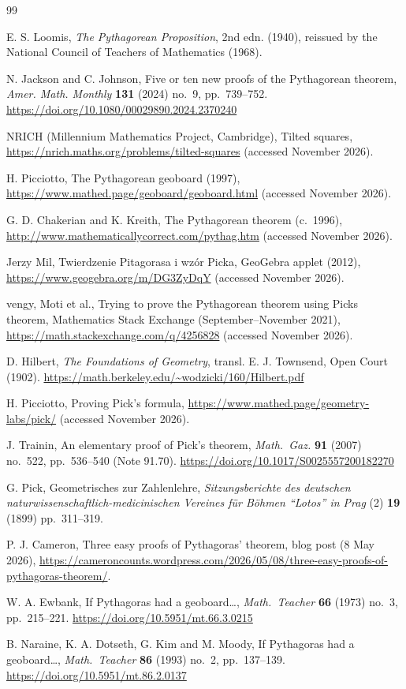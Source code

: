 \documentclass[11pt,a4paper]{article}
\theoremstyle{remark}
\begin{document}
\begin{thebibliography}{99}

 E. S. Loomis, \emph{The Pythagorean Proposition}, 2nd edn.
(1940), reissued by the National Council of Teachers of Mathematics (1968).

 N. Jackson and C. Johnson, Five or ten new proofs of
the Pythagorean theorem, \emph{Amer. Math. Monthly} \textbf{131} (2024)
no.~9, pp.~739--752. \url{https://doi.org/10.1080/00029890.2024.2370240}

 NRICH (Millennium Mathematics Project, Cambridge), Tilted
squares, \url{https://nrich.maths.org/problems/tilted-squares} (accessed
November 2026).

 H. Picciotto, The Pythagorean geoboard (1997),
\url{https://www.mathed.page/geoboard/geoboard.html} (accessed November 2026).

 G. D. Chakerian and K. Kreith, The Pythagorean theorem
(c.~1996), \url{http://www.mathematicallycorrect.com/pythag.htm} (accessed
November 2026).

 Jerzy Mil, Twierdzenie Pitagorasa i wz\'or Picka, GeoGebra applet
(2012), \url{https://www.geogebra.org/m/DG3ZyDqY} (accessed November 2026).

 vengy, Moti et al., Trying to prove the Pythagorean theorem using
Picks theorem, Mathematics Stack Exchange (September--November 2021),
\url{https://math.stackexchange.com/q/4256828} (accessed November 2026).

 D. Hilbert, \emph{The Foundations of Geometry}, transl. E. J.
Townsend, Open Court (1902). \url{https://math.berkeley.edu/~wodzicki/160/Hilbert.pdf}

 H. Picciotto, Proving Pick's formula,
\url{https://www.mathed.page/geometry-labs/pick/} (accessed November 2026).

 J. Trainin, An elementary proof of Pick's theorem,
\emph{Math.\ Gaz.} \textbf{91} (2007) no.~522, pp.~536--540 (Note 91.70).
\url{https://doi.org/10.1017/S0025557200182270}

 G. Pick, Geometrisches zur Zahlenlehre,
\emph{Sitzungsberichte des deutschen naturwissenschaftlich-medicinischen
Vereines f\"ur B\"ohmen ``Lotos'' in Prag} (2) \textbf{19} (1899)
pp.~311--319.

 P. J. Cameron, Three easy proofs of Pythagoras' theorem, blog
post (8 May 2026),
\url{https://cameroncounts.wordpress.com/2026/05/08/three-easy-proofs-of-pythagoras-theorem/}.

 W. A. Ewbank, If Pythagoras had a geoboard\ldots,
\emph{Math.\ Teacher} \textbf{66} (1973) no.~3, pp.~215--221.
\url{https://doi.org/10.5951/mt.66.3.0215}

 B. Naraine, K. A. Dotseth, G. Kim and M. Moody, If Pythagoras
had a geoboard\ldots, \emph{Math.\ Teacher} \textbf{86} (1993) no.~2,
pp.~137--139. \url{https://doi.org/10.5951/mt.86.2.0137}

\end{thebibliography}
\end{document}
